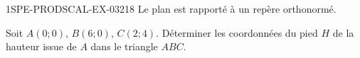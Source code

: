 \begin{exercice}{1SPE-PRODSCAL-EX-032}{1}{8}
Le plan est rapporté à un repère orthonormé.

Soit $A(0; 0)$, $B(6; 0)$, $C(2; 4)$. Déterminer les coordonnées du pied $H$ de la hauteur issue de $A$ dans le triangle $ABC$.
\end{exercice}
